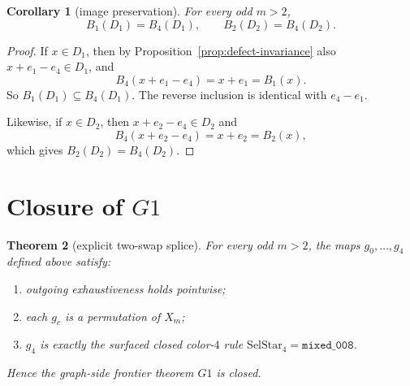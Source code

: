 \documentclass[11pt]{article}
\newtheorem{theorem}{Theorem}
\newtheorem{corollary}[theorem]{Corollary}
\begin{document}
\begin{corollary}[image preservation]
\label{cor:image-preserving}
For every odd \(m>2\),
\[
B_1(D_1)=B_4(D_1),
\qquad
B_2(D_2)=B_4(D_2).
\]
\end{corollary}

\begin{proof}
If \(x\in D_1\), then by Proposition~\ref{prop:defect-invariance} also
\(x+e_1-e_4\in D_1\), and
\[
B_4(x+e_1-e_4)=x+e_1=B_1(x).
\]
So \(B_1(D_1)\subseteq B_4(D_1)\).  The reverse inclusion is identical with
\(e_4-e_1\).

Likewise, if \(x\in D_2\), then \(x+e_2-e_4\in D_2\) and
\[
B_4(x+e_2-e_4)=x+e_2=B_2(x),
\]
which gives \(B_2(D_2)=B_4(D_2)\).
\end{proof}

\section{Closure of \(G1\)}
\begin{theorem}[explicit two-swap splice]
\label{thm:G1-closed}
For every odd \(m>2\), the maps \(g_0,\dots,g_4\) defined above satisfy:
\begin{enumerate}[label=\textup{(\arabic*)},leftmargin=2.8em]
\item outgoing exhaustiveness holds pointwise;
\item each \(g_c\) is a permutation of \(X_m\);
\item \(g_4\) is exactly the surfaced closed color-\(4\) rule
      \(\mathrm{SelStar}_4=\texttt{mixed\_008}\).
\end{enumerate}
Hence the graph-side frontier theorem \(G1\) is closed.
\end{theorem}
\end{document}
